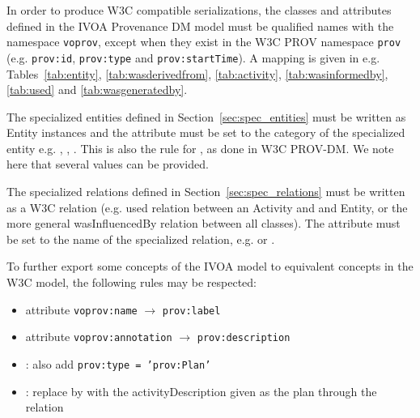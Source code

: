 In order to produce W3C compatible serializations, the classes and attributes defined in the IVOA Provenance DM model must be qualified names with the namespace \texttt{voprov}, except when they exist in the W3C PROV namespace \texttt{prov} (e.g. \texttt{prov:id}, \texttt{prov:type} and \texttt{prov:startTime}). A mapping is given in e.g. Tables~\ref{tab:entity}, \ref{tab:wasderivedfrom}, \ref{tab:activity}, \ref{tab:wasinformedby}, \ref{tab:used} and \ref{tab:wasgeneratedby}. 

The specialized entities defined in Section~\ref{sec:spec_entities} must be written as Entity instances and the attribute  must be set to the category of the specialized entity e.g. , , . This is also the rule for , as done in W3C PROV-DM. We note here that several  values can be provided.

The specialized relations defined in Section~\ref{sec:spec_relations} must be written as a W3C relation (e.g. used relation between an Activity and and Entity, or the more general wasInfluencedBy relation between all classes). The attribute  must be set to the name of the specialized relation, e.g.  or  .

To further export some concepts of the IVOA model to equivalent concepts in the W3C model, the following rules may be respected:

\begin{itemize}
\item attribute \texttt{voprov:name} $\rightarrow$ \texttt{prov:label}
\item attribute \texttt{voprov:annotation} $\rightarrow$ \texttt{prov:description}
\item {}: also add \texttt{prov:type = 'prov:Plan'}
\item {}: replace by  with the activityDescription given as the plan through the  relation
\end{itemize}

